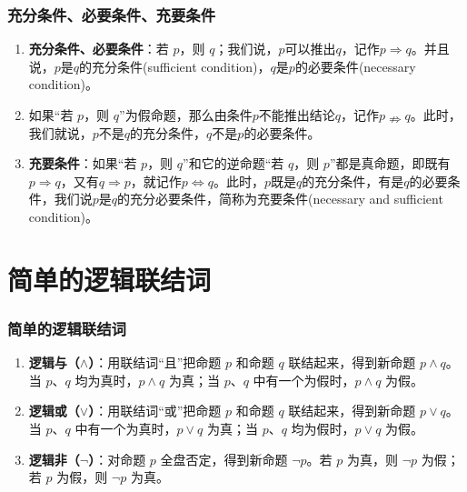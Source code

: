 \documentclass[aspectratio=169]{ctexbeamer} %
\begin{document}
\begin{frame}
\frametitle{充分条件、必要条件、充要条件}
\begin{enumerate}[label={\arabic*.}]
\item \textbf{充分条件、必要条件}：若 \(p\)，则 \(q\)；我们说，$p$可以推出$q$，记作$p \Rightarrow q$。并且说，$p$是$q$的\alert{充分条件}(sufficient condition)，$q$是$p$的\alert{必要条件}(necessary condition)。\\

\item 如果“若 \(p\)，则 \(q\)”为假命题，那么由条件$p$不能推出结论$q$，记作$p \nRightarrow q$。此时，我们就说，$p$不是$q$的\alert{充分条件}，$q$不是$p$的\alert{必要条件}。\\

\item \textbf{充要条件}：如果“若 \(p\)，则 \(q\)”和它的逆命题“若 \(q\)，则 \(p\)”都是真命题，即既有$p \Rightarrow q$，又有$q \Rightarrow p$，就记作$p \iff q$。此时，$p$既是$q$的\alert{充分条件}，有是$q$的\alert{必要条件}，我们说$p$是$q$的\alert{充分必要条件}，简称为\alert{充要条件}(necessary and sufficient condition)。

\end{enumerate}
\end{frame}\section{简单的逻辑联结词}
\begin{frame}
\frametitle{简单的逻辑联结词}
\begin{enumerate}[label={\arabic*.}]
\item \textbf{逻辑与（\(\land\)）}：用联结词“且”把命题 \(p\) 和命题 \(q\) 联结起来，得到新命题 \(p \land q\)。当 \(p\)、\(q\) 均为真时，\(p \land q\) 为真；当 \(p\)、\(q\) 中有一个为假时，\(p \land q\) 为假。\\

\item \textbf{逻辑或（\(\lor\)）}：用联结词“或”把命题 \(p\) 和命题 \(q\) 联结起来，得到新命题 \(p \lor q\)。当 \(p\)、\(q\) 中有一个为真时，\(p \lor q\) 为真；当 \(p\)、\(q\) 均为假时，\(p \lor q\) 为假。\\

\item \textbf{逻辑非（\(\neg\)）}：对命题 \(p\) 全盘否定，得到新命题 \(\neg p\)。若 \(p\) 为真，则 \(\neg p\) 为假；若 \(p\) 为假，则 \(\neg p\) 为真。\\

\end{enumerate}
\end{frame}
\end{document}
